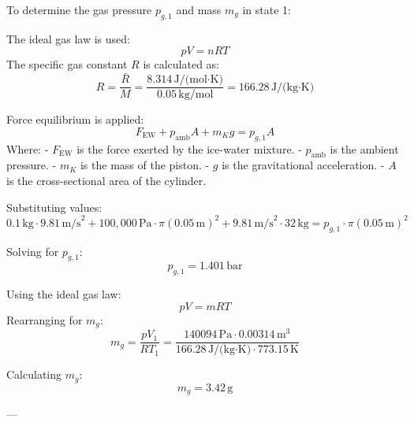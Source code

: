 To determine the gas pressure \( p_{g,1} \) and mass \( m_g \) in state 1:  

The ideal gas law is used:  
\[
pV = nRT
\]  
The specific gas constant \( R \) is calculated as:  
\[
R = \frac{\bar{R}}{M} = \frac{8.314 \, \text{J/(mol·K)}}{0.05 \, \text{kg/mol}} = 166.28 \, \text{J/(kg·K)}
\]  

Force equilibrium is applied:  
\[
F_{\text{EW}} + p_{\text{amb}} A + m_K g = p_{g,1} A
\]  
Where:  
- \( F_{\text{EW}} \) is the force exerted by the ice-water mixture.  
- \( p_{\text{amb}} \) is the ambient pressure.  
- \( m_K \) is the mass of the piston.  
- \( g \) is the gravitational acceleration.  
- \( A \) is the cross-sectional area of the cylinder.  

Substituting values:  
\[
0.1 \, \text{kg} \cdot 9.81 \, \text{m/s}^2 + 100,000 \, \text{Pa} \cdot \pi (0.05 \, \text{m})^2 + 9.81 \, \text{m/s}^2 \cdot 32 \, \text{kg} = p_{g,1} \cdot \pi (0.05 \, \text{m})^2
\]  

Solving for \( p_{g,1} \):  
\[
p_{g,1} = 1.401 \, \text{bar}
\]  

Using the ideal gas law:  
\[
pV = mRT
\]  
Rearranging for \( m_g \):  
\[
m_g = \frac{p V_1}{R T_1} = \frac{140094 \, \text{Pa} \cdot 0.00314 \, \text{m}^3}{166.28 \, \text{J/(kg·K)} \cdot 773.15 \, \text{K}}
\]  

Calculating \( m_g \):  
\[
m_g = 3.42 \, \text{g}
\]  

---